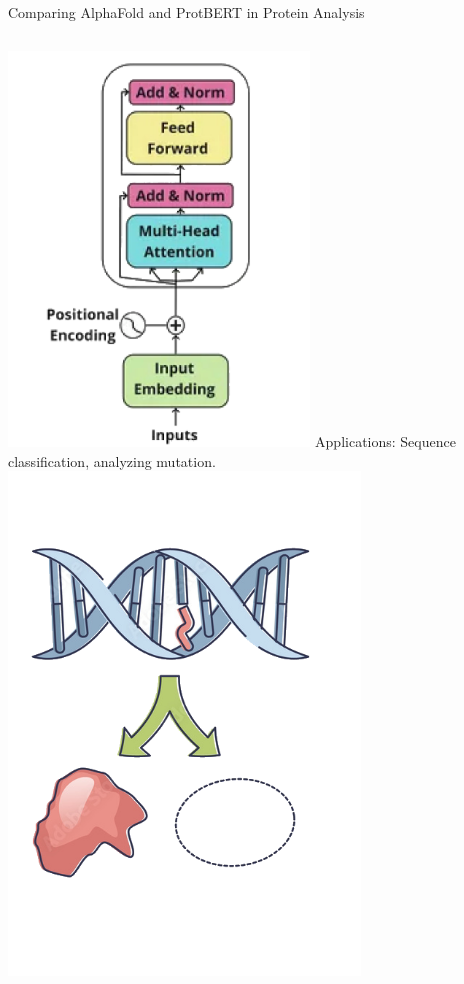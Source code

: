 \begin{frame}{Comparing AlphaFold and ProtBERT in Protein Analysis}
\begin{columns}
\begin{column}{0.5\textwidth}
{                    \includegraphics[width = 0.6\textwidth]{images/transformer1.PNG}
                    }
                 {
                    Applications: Sequence classification, analyzing mutation.
                    \includegraphics[width = 0.7\textwidth]{images/mutation.png}
                    }
            \vspace{1em}
            
        \end{column}
    \end{columns}
\end{frame}